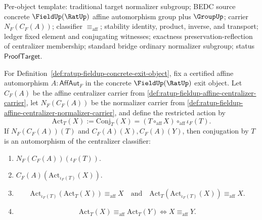 Per-object template: traditional target normalizer subgroup; BEDC source
concrete $\FieldUp(\RatUp)$ affine automorphism group plus $\GroupUp$; carrier
$N_F(C_F(A))$; classifier $\equiv_{\mathrm{aff}}$; stability identity, product,
inverse, and transport; ledger fixed element and conjugating witnesses;
exactness preservation-reflection of centralizer membership; standard bridge
ordinary normalizer subgroup; status $\mathsf{ProofTarget}$.

\begin{theorem}
\label{thm:ratup-fieldup-affine-centralizer-normalizer-action-automorphism}
For Definition~\ref{def:ratup-fieldup-concrete-exit-object}, fix a certified
affine automorphism $A:\mathsf{AffAut}_F$ in the concrete $\FieldUp(\RatUp)$
exit object. Let $C_F(A)$ be the affine centralizer carrier from
\autoref{def:ratup-fieldup-affine-centralizer-carrier}, let $N_F(C_F(A))$ be
the normalizer carrier from
\autoref{def:ratup-fieldup-affine-centralizer-normalizer-carrier}, and define
the restricted action by
$$
\mathrm{Act}_T(X):=\mathrm{Conj}_T(X)
=(T\circ_{\mathrm{aff}}X)\circ_{\mathrm{aff}}\iota_F(T).
$$
If $N_F(C_F(A))(T)$ and $C_F(A)(X),C_F(A)(Y)$, then conjugation by $T$ is an
automorphism of the centralizer classifier:
\begin{enumerate}
\item $N_F(C_F(A))(\iota_F(T))$.
\item $C_F(A)(\mathrm{Act}_{\iota_F(T)}(X))$.
\item
$$
\mathrm{Act}_{\iota_F(T)}(\mathrm{Act}_T(X))\equiv_{\mathrm{aff}}X
\quad\text{and}\quad
\mathrm{Act}_T(\mathrm{Act}_{\iota_F(T)}(X))\equiv_{\mathrm{aff}}X.
$$
\item
$$
\mathrm{Act}_T(X)\equiv_{\mathrm{aff}}\mathrm{Act}_T(Y)
\Longleftrightarrow X\equiv_{\mathrm{aff}}Y.
$$
\end{enumerate}
\end{theorem}
